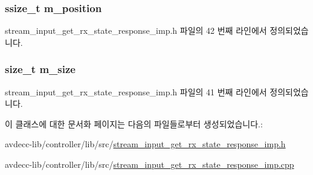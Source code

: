 \subsubsection[{\texorpdfstring{m\+\_\+position}{m_position}}]{\setlength{\rightskip}{0pt plus 5cm}ssize\+\_\+t m\+\_\+position\hspace{0.3cm}{\ttfamily [private]}}\hypertarget{classavdecc__lib_1_1stream__input__get__rx__state__response__imp_af5e691c4a8a0feb07f48440b321206cd}{}\label{classavdecc__lib_1_1stream__input__get__rx__state__response__imp_af5e691c4a8a0feb07f48440b321206cd}


stream\+\_\+input\+\_\+get\+\_\+rx\+\_\+state\+\_\+response\+\_\+imp.\+h 파일의 42 번째 라인에서 정의되었습니다.

\subsubsection[{\texorpdfstring{m\+\_\+size}{m_size}}]{\setlength{\rightskip}{0pt plus 5cm}size\+\_\+t m\+\_\+size\hspace{0.3cm}{\ttfamily [private]}}\hypertarget{classavdecc__lib_1_1stream__input__get__rx__state__response__imp_a0dc3c363255f193681c77b4d2a82e995}{}\label{classavdecc__lib_1_1stream__input__get__rx__state__response__imp_a0dc3c363255f193681c77b4d2a82e995}


stream\+\_\+input\+\_\+get\+\_\+rx\+\_\+state\+\_\+response\+\_\+imp.\+h 파일의 41 번째 라인에서 정의되었습니다.



이 클래스에 대한 문서화 페이지는 다음의 파일들로부터 생성되었습니다.\+:\begin{DoxyCompactItemize}
\item 
avdecc-\/lib/controller/lib/src/\hyperlink{stream__input__get__rx__state__response__imp_8h}{stream\+\_\+input\+\_\+get\+\_\+rx\+\_\+state\+\_\+response\+\_\+imp.\+h}\item 
avdecc-\/lib/controller/lib/src/\hyperlink{stream__input__get__rx__state__response__imp_8cpp}{stream\+\_\+input\+\_\+get\+\_\+rx\+\_\+state\+\_\+response\+\_\+imp.\+cpp}\end{DoxyCompactItemize}
